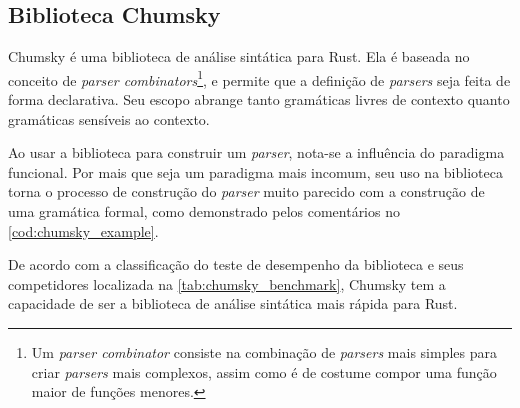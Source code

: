 \subsection{Biblioteca Chumsky}\label{sec:chumsky}

Chumsky é uma biblioteca de análise sintática para Rust. Ela é baseada no conceito de \textit{parser combinators}\footnote{Um \textit{parser combinator} consiste na combinação de \textit{parsers} mais simples para criar \textit{parsers} mais complexos, assim como é de costume compor uma função maior de funções menores.}, e permite que a definição de \textit{parsers} seja feita de forma declarativa. Seu escopo abrange tanto gramáticas livres de contexto quanto gramáticas sensíveis ao contexto.

Ao usar a biblioteca para construir um \textit{parser}, nota-se a influência do paradigma funcional. Por mais que seja um paradigma mais incomum, seu uso na biblioteca torna o processo de construção do \textit{parser} muito parecido com a construção de uma gramática formal, como demonstrado pelos comentários no \autoref{cod:chumsky_example}.

\codigoRust

\vspace{-1em}

De acordo com a classificação do teste de desempenho da biblioteca e seus competidores localizada na \autoref{tab:chumsky_benchmark}, Chumsky tem a capacidade de ser a biblioteca de análise sintática mais rápida para Rust.

\FloatBarrier


